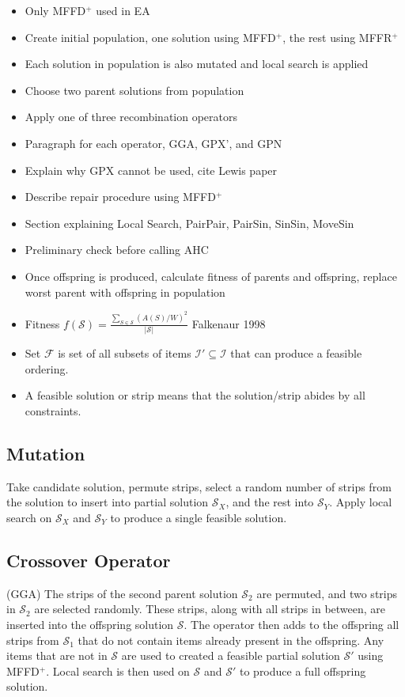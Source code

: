 \documentclass{elsarticle}
\begin{document}
\begin{itemize}
	\item Only MFFD$^+$ used in EA
	\item Create initial population, one solution using MFFD$^+$, the rest using MFFR$^+$
	\item Each solution in population is also mutated and local search is applied
	\item Choose two parent solutions from population
	\item Apply one of three recombination operators
	\item Paragraph for each operator, GGA, GPX', and GPN
	\item Explain why GPX cannot be used, cite Lewis paper
	\item Describe repair procedure using MFFD$^+$
	\item Section explaining Local Search, PairPair, PairSin, SinSin, MoveSin
	\item Preliminary check before calling AHC
	\item Once offspring is produced, calculate fitness of parents and offspring, replace worst parent with offspring in population
	\item Fitness $f(\mathcal{S}) = \frac{\sum_{S \in \mathcal{S}} (A(S)/W)^2}{|\mathcal{S}|}$ Falkenaur 1998
	\item Set $\mathcal{F}$ is set of all subsets of items $\mathcal{I}' \subseteq \mathcal{I}$ that can produce a feasible ordering.
	\item A feasible solution or strip means that the solution/strip abides by all constraints.
\end{itemize}

\subsection{Mutation}
\label{sub:mutation}
Take candidate solution, permute strips, select a random number of strips from the solution to insert into partial solution $\mathcal{S}_X$, and the rest into $\mathcal{S}_Y$. Apply local search on $\mathcal{S}_X$ and $\mathcal{S}_Y$ to produce a single feasible solution.

\subsection{Crossover Operator}
\label{sub:xover}
(GGA) The strips of the second parent solution $\mathcal{S}_2$ are permuted, and two strips in $\mathcal{S}_2$ are selected randomly. These strips, along with all strips in between, are inserted into the offspring solution $\mathcal{S}$. The operator then adds to the offspring all strips from $\mathcal{S}_1$ that do not contain items already present in the offspring. Any items that are not in $\mathcal{S}$ are used to created a feasible partial solution $\mathcal{S}'$ using MFFD$^+$. Local search is then used on $\mathcal{S}$ and $\mathcal{S}'$ to produce a full offspring solution.
\end{document}
